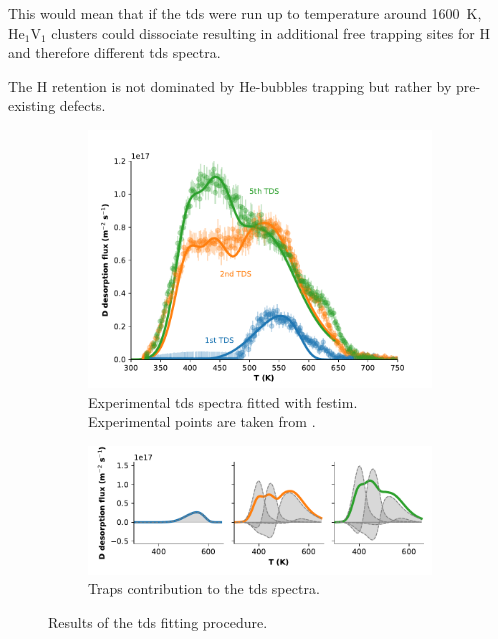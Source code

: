 This would mean that if the \gls{tds} were run up to temperature around \SI{1600}{K}, $\mathrm{He}_1\mathrm{V}_1$ clusters could dissociate resulting in additional free trapping sites for \gls{H} and therefore different \gls{tds} spectra.

The \gls{H} retention is not dominated by \gls{He}-bubbles trapping but rather by pre-existing defects.

\begin{figure}[h!]
    \centering
    \begin{subfigure}{\linewidth}
        \includegraphics[width=\linewidth]{Figures/Chapter5/ialovega_tds.pdf}
        \caption{Experimental \gls{tds} spectra fitted with \gls{festim}. Experimental points are taken from \cite{ialovega_hydrogen_2020}.}
    \end{subfigure}
    \begin{subfigure}{\linewidth}
        \includegraphics[width=\linewidth]{Figures/Chapter5/tds_trap_distribution.pdf}
        \caption{Traps contribution to the \gls{tds} spectra.}
    \end{subfigure}
    \caption{Results of the \gls{tds} fitting procedure.}
\end{figure}

